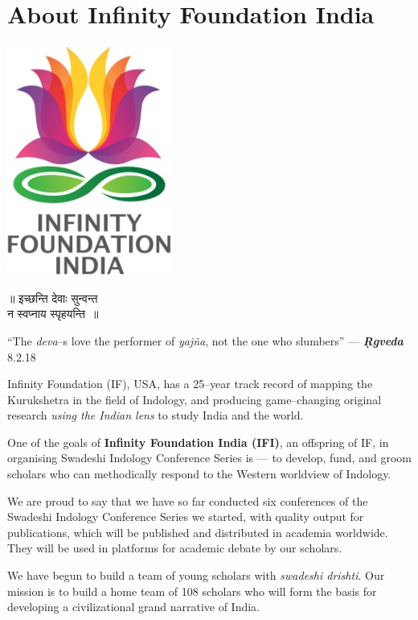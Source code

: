 
\chapter*{About Infinity Foundation India}\label{about}

\begin{center}
\includegraphics[scale=0.23]{images/logo.png}
\end{center}

\begin{center}
॥ इच्छन्ति देवाः सुन्वन्त\\ न स्वप्नाय स्पृहयन्ति~॥
\end{center}

\begin{center}
“The \textit{deva}–s love the performer of \textit{yajña}, not the one who slumbers” — \textbf{\textit{Ṛgveda}} 8.2.18
\end{center}

Infinity Foundation (IF), USA, has a 25–year track record of mapping the Kurukshetra in the field of Indology, and producing game–changing original research \textit{using the Indian lens} to study India and the world.

One of the goals of \textbf{Infinity Foundation India (IFI)}, an offspring of IF, in organising Swadeshi Indology Conference Series is — to develop, fund, and groom scholars who can methodically respond to the Western worldview of Indology.

We are proud to say that we have so far conducted six conferences of the Swadeshi Indology Conference Series we started, with quality output for publications, which will be published and distributed in academia worldwide. They will be used in platforms for academic debate by our scholars.

We have begun to build a team of young scholars with \textit{swadeshi drishti}. Our mission is to build a home team of 108 scholars who will form the basis for developing a civilizational grand narrative of India.


